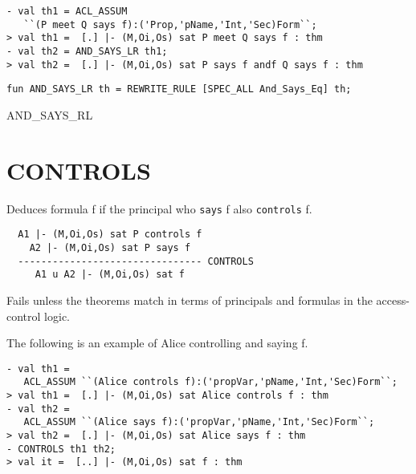 \EXAMPLE
\begin{holboxed}
\begin{verbatim}
- val th1 = ACL_ASSUM 
   ``(P meet Q says f):('Prop,'pName,'Int,'Sec)Form``;
> val th1 =  [.] |- (M,Oi,Os) sat P meet Q says f : thm
- val th2 = AND_SAYS_LR th1;
> val th2 =  [.] |- (M,Oi,Os) sat P says f andf Q says f : thm
\end{verbatim}
\end{holboxed}
\IMPLEMENTATION
\begin{holboxed}
\begin{verbatim}
fun AND_SAYS_LR th = REWRITE_RULE [SPEC_ALL And_Says_Eq] th;
\end{verbatim}
\end{holboxed}

\SEEALSO
AND\_SAYS\_RL
\ENDDOC

\section{CONTROLS}



\egroup


\SYNOPSIS Deduces formula f if the principal who \texttt{says} f also
\texttt{controls} f.

\DESCRIBE
\begin{verbatim}
  A1 |- (M,Oi,Os) sat P controls f   
    A2 |- (M,Oi,Os) sat P says f
  -------------------------------- CONTROLS
     A1 u A2 |- (M,Oi,Os) sat f
\end{verbatim}

\FAILURE
Fails unless the theorems match in terms of principals and formulas
in the access-control logic.

\EXAMPLE
The following is an example of Alice controlling and saying f.
\begin{holboxed}
\begin{verbatim}
- val th1 = 
   ACL_ASSUM ``(Alice controls f):('propVar,'pName,'Int,'Sec)Form``;
> val th1 =  [.] |- (M,Oi,Os) sat Alice controls f : thm
- val th2 = 
   ACL_ASSUM ``(Alice says f):('propVar,'pName,'Int,'Sec)Form``;
> val th2 =  [.] |- (M,Oi,Os) sat Alice says f : thm
- CONTROLS th1 th2;
> val it =  [..] |- (M,Oi,Os) sat f : thm
\end{verbatim}
\end{holboxed}

